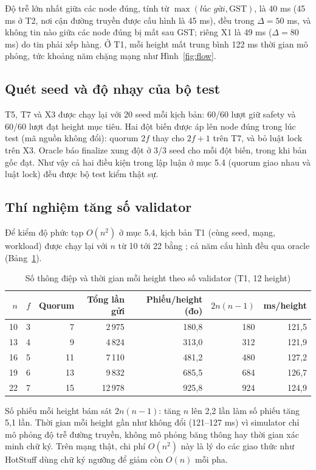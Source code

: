 \documentclass[a4paper,12pt]{article}
\newcommand{\code}[1]{\texttt{\detokenize{#1}}}
\newcommand{\tablefont}{\fontsize{10.5}{12.6}\selectfont}
\begin{document}
Độ trễ lớn nhất giữa các node đúng, tính từ $\max(\textit{lúc gửi}, \mathrm{GST})$, là 40 ms (45 ms ở T2,
nơi cận đường truyền được cấu hình là 45 ms), đều trong $\Delta = 50$ ms, và không tin nào giữa các node
đúng bị mất sau GST; riêng X1 là 49 ms ($\Delta = 80$ ms) do tin phải xếp hàng. Ở T1, mỗi height mất trung
bình 122 ms thời gian mô phỏng, tức khoảng năm chặng mạng như Hình~\ref{fig:flow}.

\subsection{Quét seed và độ nhạy của bộ test}
T5, T7 và X3 được chạy lại với 20 seed mỗi kịch bản: 60/60 lượt giữ safety và 60/60 lượt đạt height mục
tiêu. Hai đột biến được áp lên node đúng trong lúc test (mã nguồn không đổi): quorum $2f$ thay cho $2f+1$
trên T7, và bỏ luật lock trên X3. Oracle báo finalize xung đột ở 3/3 seed cho mỗi đột biến, trong khi bản
gốc đạt. Như vậy cả hai điều kiện trong lập luận ở mục 5.4 (quorum giao nhau và luật lock) đều được bộ test
kiểm thật sự.

\subsection{Thí nghiệm tăng số validator}
Để kiểm độ phức tạp $O(n^2)$ ở mục 5.4, kịch bản T1 (cùng seed, mạng, workload) được chạy lại với $n$ từ 10
tới 22 bằng \code{python -m tests.experiment_scaling}; cả năm cấu hình đều qua oracle (Bảng~\ref{tab:scale}).

\begin{table}[h]
\centering\tablefont
\caption{Số thông điệp và thời gian mỗi height theo số validator (T1, 12 height)}\label{tab:scale}
\begin{tabular}{@{}rrrrrrr@{}}
\toprule
$n$ & $f$ & Quorum & Tổng lần gửi & Phiếu/height (đo) & $2n(n-1)$ & ms/height \\ \midrule
10 & 3 & 7 & 2\,975 & 180,8 & 180 & 121,5 \\
13 & 4 & 9 & 4\,824 & 313,0 & 312 & 121,9 \\
16 & 5 & 11 & 7\,110 & 481,2 & 480 & 127,2 \\
19 & 6 & 13 & 9\,832 & 685,5 & 684 & 126,7 \\
22 & 7 & 15 & 12\,978 & 925,8 & 924 & 124,9 \\
\bottomrule
\end{tabular}
\end{table}

Số phiếu mỗi height bám sát $2n(n-1)$: tăng $n$ lên 2,2 lần làm số phiếu tăng 5,1 lần. Thời gian mỗi height
gần như không đổi (121--127 ms) vì simulator chỉ mô phỏng độ trễ đường truyền, không mô phỏng băng thông hay
thời gian xác minh chữ ký. Trên mạng thật, chi phí $O(n^2)$ này là lý do các giao thức như HotStuff dùng chữ
ký ngưỡng để giảm còn $O(n)$ mỗi pha.
\end{document}
